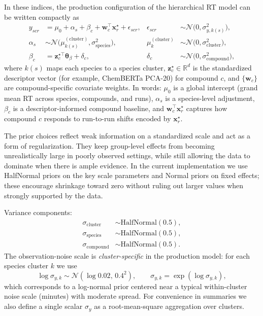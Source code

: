 \documentclass[11pt]{article}
\begin{document}
In these indices, the production configuration of the hierarchical RT model can be
written compactly as
\begin{align}
  y_{scr}
  &=
  \mu_0
  +
  \alpha_{s}
  +
  \beta_{c}
  +
  \bm{w}_{c}^{\top}\bm{x}^{\star}_{r}
  +
  \epsilon_{scr},
  &
  \epsilon_{scr} &\sim\mathcal{N}\!\bigl(0,\sigma^2_{y,k(s)}\bigr),
  \label{eq:rt-observation}\\[0.4em]
  \alpha_{s}
  &\sim\mathcal{N}\!\bigl(\mu^{\mathrm{(cluster)}}_{k(s)},\sigma^2_{\mathrm{species}}\bigr),
  &
  \mu^{\mathrm{(cluster)}}_{k}
  &\sim\mathcal{N}\!\bigl(0,\sigma^2_{\mathrm{cluster}}\bigr),
  \label{eq:rt-species}\\[0.4em]
  \beta_{c}
  &=
  \bm{z}_{c}^{\star\top}\bm{\theta}_\beta + \delta_c,
  &
  \delta_c &\sim \mathcal{N}\!\bigl(0,\sigma^2_{\mathrm{compound}}\bigr),
  \label{eq:rt-compound}
\end{align}
where $k(s)$ maps each species to a species cluster, $\bm{z}_c^{\star}\in\mathbb{R}^d$
is the standardized descriptor vector (for example, ChemBERTa PCA-20) for compound
$c$, and $\{\bm{w}_c\}$ are compound-specific covariate weights. In words:
$\mu_0$ is a global intercept (grand mean RT across species, compounds, and runs),
$\alpha_s$ is a species-level adjustment, $\beta_c$ is a descriptor-informed compound
baseline, and $\bm{w}_c^{\top}\bm{x}^{\star}_r$ captures how compound $c$ responds to
run-to-run shifts encoded by $\bm{x}^{\star}_r$.

The prior choices reflect weak information on a standardized scale and act as a form
of regularization. They keep group-level effects from becoming unrealistically large
in poorly observed settings, while still allowing the data to dominate when there is
ample evidence. In the current implementation we use HalfNormal priors on the key
scale parameters and Normal priors on fixed effects; these encourage shrinkage toward
zero without ruling out larger values when strongly supported by the data.

Variance components:
\begin{align}
  \sigma_{\mathrm{cluster}} &\sim \mathrm{HalfNormal}(0.5), \\
  \sigma_{\mathrm{species}} &\sim \mathrm{HalfNormal}(0.5), \\
  \sigma_{\mathrm{compound}} &\sim \mathrm{HalfNormal}(0.5).
\end{align}
The observation-noise scale is \emph{cluster-specific} in the production model:
for each species cluster $k$ we use
\begin{equation}
  \log \sigma_{y,k}\sim\mathcal{N}(\log 0.02,\,0.4^2),
  \qquad
  \sigma_{y,k} = \exp(\log \sigma_{y,k}),
\end{equation}
which corresponds to a log-normal prior centered near a typical within-cluster noise
scale (minutes) with moderate spread. For convenience in summaries we also define a
single scalar $\sigma_y$ as a root-mean-square aggregation over clusters.
\end{document}
